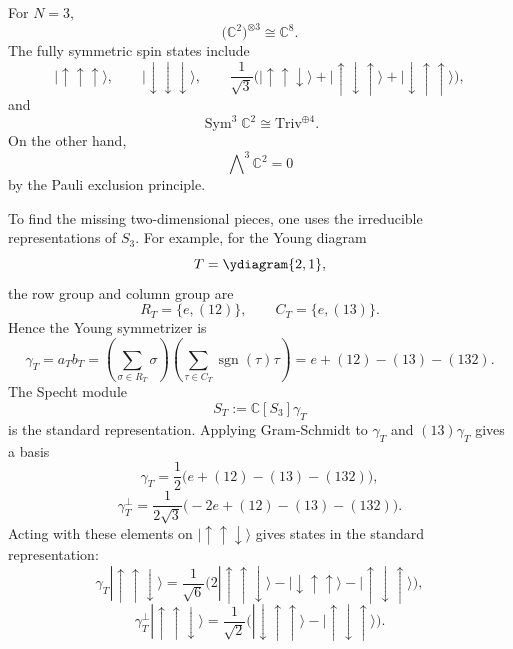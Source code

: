 {    For \(N=3\),
    \[
        \bigl(\mathbb{C}^2\bigr)^{\otimes 3}\cong \mathbb{C}^8.
    \]
    The fully symmetric spin states include
    \[
        |\uparrow\uparrow\uparrow\rangle,
        \qquad
        |\downarrow\downarrow\downarrow\rangle,
        \qquad
        \frac{1}{\sqrt{3}}
        \bigl(
            |\uparrow\uparrow\downarrow\rangle
            +
            |\uparrow\downarrow\uparrow\rangle
            +
            |\downarrow\uparrow\uparrow\rangle
        \bigr),
    \]
    and
    \[
        \operatorname{Sym}^3\mathbb{C}^2\cong\mathrm{Triv}^{\oplus 4}.
    \]
    On the other hand,
    \[
        \bigwedge\nolimits^3\mathbb{C}^2=0
    \]
    by the Pauli exclusion principle.

    To find the missing two-dimensional pieces, one uses the irreducible
    representations of \(S_3\). For example, for the Young diagram
    \[
        T=
        \ydiagram{2,1},
    \]
    the row group and column group are
    \[
        R_T=\{e,(12)\},
        \qquad
        C_T=\{e,(13)\}.
    \]
    Hence the Young symmetrizer is
    \[
        \gamma_T
        =
        a_T b_T
        =
        \left(\sum_{\sigma\in R_T}\sigma\right)
        \left(\sum_{\tau\in C_T}\operatorname{sgn}(\tau)\tau\right)
        =
        e+(12)-(13)-(132).
    \]
    The Specht module
    \[
        S_T:=\mathbb{C}[S_3]\gamma_T
    \]
    is the standard representation. Applying Gram-Schmidt to
    \(\gamma_T\) and \((13)\gamma_T\) gives a basis
    \[
        \gamma_T
        =
        \frac12\bigl(e+(12)-(13)-(132)\bigr),
    \]
    \[
        \gamma_T^\perp
        =
        \frac{1}{2\sqrt{3}}
        \bigl(-2e+(12)-(13)-(132)\bigr).
    \]
    Acting with these elements on
    \(|\uparrow\uparrow\downarrow\rangle\) gives states in the standard
    representation:
    \[
        \gamma_T|\uparrow\uparrow\downarrow\rangle
        =
        \frac{1}{\sqrt{6}}
        \bigl(
            2|\uparrow\uparrow\downarrow\rangle
            -
            |\downarrow\uparrow\uparrow\rangle
            -
            |\uparrow\downarrow\uparrow\rangle
        \bigr),
    \]
    \[
        \gamma_T^\perp|\uparrow\uparrow\downarrow\rangle
        =
        \frac{1}{\sqrt{2}}
        \bigl(
            |\downarrow\uparrow\uparrow\rangle
            -
            |\uparrow\downarrow\uparrow\rangle
        \bigr).
    \]

    }
